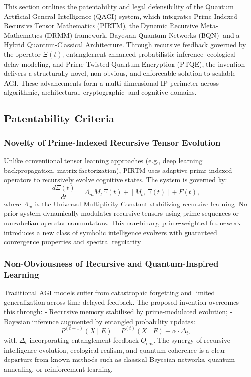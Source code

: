 \documentclass{article}
\theoremstyle{plain}
\theoremstyle{claimstyle}
\begin{document}
This section outlines the patentability and legal defensibility of the Quantum Artificial General Intelligence (QAGI) system, which integrates Prime-Indexed Recursive Tensor Mathematics (PIRTM), the Dynamic Recursive Meta-Mathematics (DRMM) framework, Bayesian Quantum Networks (BQN), and a Hybrid Quantum-Classical Architecture. Through recursive feedback governed by the operator $\Xi(t)$, entanglement-enhanced probabilistic inference, ecological delay modeling, and Prime-Twisted Quantum Encryption (PTQE), the invention delivers a structurally novel, non-obvious, and enforceable solution to scalable AGI. These advancements form a multi-dimensional IP perimeter across algorithmic, architectural, cryptographic, and cognitive domains.

\subsection{Patentability Criteria}

\subsubsection{Novelty of Prime-Indexed Recursive Tensor Evolution}

Unlike conventional tensor learning approaches (e.g., deep learning backpropagation, matrix factorization), PIRTM uses adaptive prime-indexed operators to recursively evolve cognitive states. The system is governed by:
\begin{equation}
\frac{d\Xi(t)}{dt} = \Lambda_m M_t \Xi(t) + [M_t, \Xi(t)] + F(t),
\end{equation}
where $\Lambda_m$ is the Universal Multiplicity Constant stabilizing recursive learning. No prior system dynamically modulates recursive tensors using prime sequences or non-abelian operator commutators. This non-binary, prime-weighted framework introduces a new class of symbolic intelligence evolvers with guaranteed convergence properties and spectral regularity.

\subsubsection{Non-Obviousness of Recursive and Quantum-Inspired Learning}

Traditional AGI models suffer from catastrophic forgetting and limited generalization across time-delayed feedback. The proposed invention overcomes this through:
- Recursive memory stabilized by prime-modulated evolution;
- Bayesian inference augmented by entangled probability updates:
\begin{equation}
P^{(t+1)}(X \mid E) = P^{(t)}(X \mid E) + \alpha \cdot \Delta_t,
\end{equation}
with $\Delta_t$ incorporating entanglement feedback $Q_{\text{ent}}$. The synergy of recursive intelligence evolution, ecological realism, and quantum coherence is a clear departure from known methods such as classical Bayesian networks, quantum annealing, or reinforcement learning.
\end{document}
